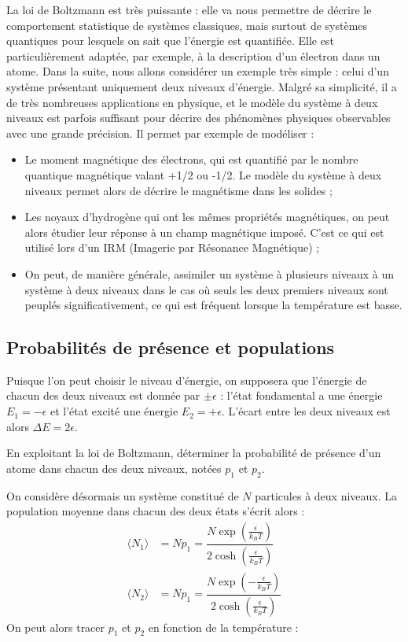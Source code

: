 \documentclass[11pt,fleqn]{book} %
\begin{document}
La loi de Boltzmann est très puissante : elle va nous permettre de décrire le comportement statistique de systèmes classiques, mais surtout de systèmes quantiques pour lesquels on sait que l'énergie est quantifiée. Elle est particulièrement adaptée, par exemple, à la description d'un électron dans un atome. Dans la suite, nous allons considérer un exemple très simple : celui d'un système présentant uniquement deux niveaux d'énergie. Malgré sa simplicité, il a de très nombreuses applications en physique, et le modèle du système à deux niveaux est parfois suffisant pour décrire des phénomènes physiques observables avec une grande précision. Il permet par exemple de modéliser :
\begin{itemize}
	\item Le moment magnétique des électrons, qui est quantifié par le nombre quantique magnétique valant +1/2 ou -1/2. Le modèle du système à deux niveaux permet alors de décrire le magnétisme dans les solides ;
	\item Les noyaux d'hydrogène qui ont les mêmes propriétés magnétiques, on peut alors étudier leur réponse à un champ magnétique imposé. C'est ce qui est utilisé lors d'un IRM (Imagerie par Résonance Magnétique) ;
	\item On peut, de manière générale, assimiler un système à plusieurs niveaux à un système à deux niveaux dans le cas où seuls les deux premiers niveaux sont peuplés significativement, ce qui est fréquent lorsque la température est basse.
\end{itemize}

\subsection{Probabilités de présence et populations}

Puisque l'on peut choisir le niveau d'énergie, on supposera que l'énergie de chacun des deux niveaux est donnée par $\pm \epsilon$ : l'état fondamental a une énergie $E_1=-\epsilon$ et l'état excité une énergie $E_2 = +\epsilon$. L'écart entre les deux niveaux est alors $\Delta E = 2 \epsilon$.

\begin{capex}
	En exploitant la loi de Boltzmann, déterminer la probabilité de présence d'un atome dans chacun des deux niveaux, notées $p_1$ et $p_2$.
\end{capex}

On considère désormais un système constitué de $N$ particules à deux niveaux. La population moyenne dans chacun des deux états s'écrit alors :
\begin{align}
	\langle N_1 \rangle &= N p_1 = \dfrac{N \exp\left(\frac{\epsilon}{k_B T}\right)}{2 \cosh\left(\frac{\epsilon}{k_B T}\right)} \\
	\langle N_2 \rangle &= N p_1 = \dfrac{N \exp\left(-\frac{\epsilon}{k_B T}\right)}{2 \cosh\left(\frac{\epsilon}{k_B T}\right)}
\end{align}
On peut alors tracer $p_1$ et $p_2$ en fonction de la température :
\end{document}
